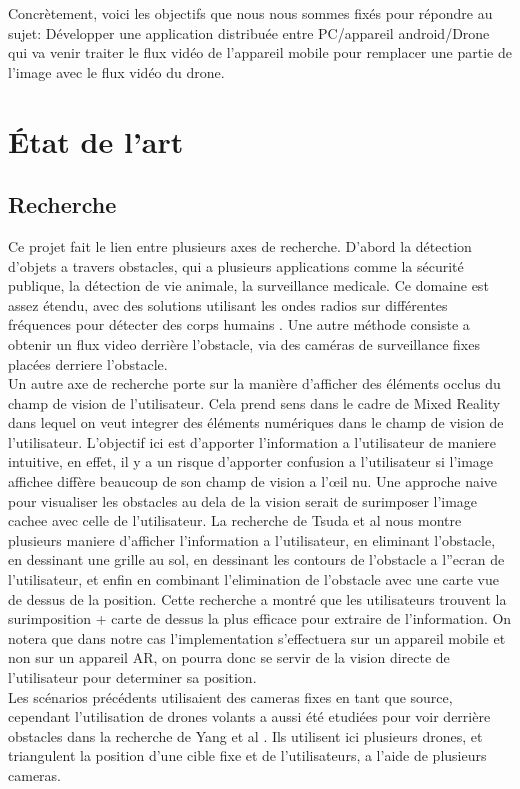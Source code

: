 \documentclass{article}
\begin{document}
Concr\`etement, voici les objectifs que nous nous sommes fix\'es pour r\'epondre au sujet: D\'evelopper une application distribu\'ee entre PC/appareil android/Drone 
qui va venir traiter le flux vid\'eo de l'appareil mobile pour remplacer une
partie de l'image avec le flux vid\'eo du drone. 

\section{État de l'art}

\subsection{Recherche}

Ce projet fait le lien entre plusieurs axes de recherche. D'abord la détection d'objets a
travers obstacles, qui a plusieurs applications comme la sécurité publique, la
détection de vie animale, la surveillance medicale. Ce domaine est
assez \'etendu, avec des solutions utilisant les ondes radios sur différentes
fréquences pour détecter des corps humains \cite{mu2020survey}. Une autre
méthode consiste a obtenir un flux video derrière l'obstacle, via des caméras de
surveillance fixes placées derriere l'obstacle. \cite{kameda2004outdoor} \\ Un autre axe de recherche
porte sur la manière d'afficher des éléments occlus du champ de vision de
l'utilisateur. Cela prend sens dans le cadre de Mixed Reality dans lequel on
veut integrer des éléments numériques dans le champ de vision de l'utilisateur.
L'objectif ici est d'apporter l'information a l'utilisateur de maniere
intuitive, en effet, il y a un risque d'apporter confusion a l'utilisateur si
l'image affichee diffère beaucoup de son champ de vision a l’œil nu. Une
approche naive pour visualiser les obstacles au dela de la vision serait de
surimposer l'image cachee avec celle de l'utilisateur. La recherche de Tsuda et
al\cite{tsuda2005visualization} nous montre plusieurs maniere d'afficher
l'information a l'utilisateur, en eliminant l'obstacle, en dessinant une grille
au sol, en dessinant les contours de l'obstacle a l''ecran de l'utilisateur, et
enfin en combinant l'elimination de l'obstacle avec une carte vue de dessus de
la position. Cette recherche a montré que les utilisateurs trouvent la
surimposition + carte de dessus la plus efficace pour extraire de l'information.
On notera que dans notre cas l'implementation s'effectuera sur un appareil
mobile et non sur un appareil AR, on pourra donc se servir de la vision directe
de l'utilisateur pour determiner sa position.\\ 
Les scénarios précédents utilisaient des cameras fixes en tant que source,
cependant l'utilisation de drones volants a aussi \'et\'e etudi\'ees pour voir
derri\`ere obstacles dans la recherche de Yang et al \cite{yang2024see}. Ils
utilisent ici plusieurs drones, et triangulent la position d'une cible fixe et
de l'utilisateurs, a l'aide de plusieurs cameras.
\end{document}
